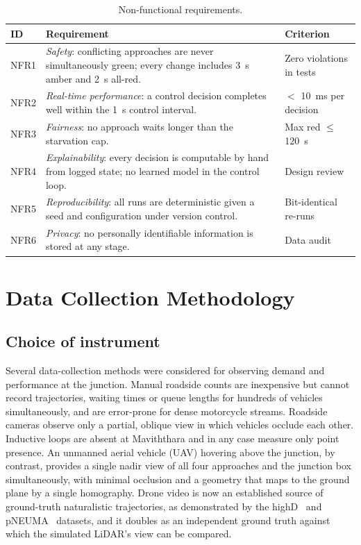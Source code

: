 \begin{table}[H]
\centering
\caption{Non-functional requirements.}
\label{tab:nfr}
\small
\begin{tabularx}{\textwidth}{@{}lXl@{}}
\toprule
\textbf{ID} & \textbf{Requirement} & \textbf{Criterion}\\
\midrule
NFR1 & \emph{Safety}: conflicting approaches are never simultaneously green; every change includes 3~s amber and 2~s all-red. & Zero violations in tests\\
NFR2 & \emph{Real-time performance}: a control decision completes well within the 1~s control interval. & $<$ 10~ms per decision\\
NFR3 & \emph{Fairness}: no approach waits longer than the starvation cap. & Max red $\le$ 120~s\\
NFR4 & \emph{Explainability}: every decision is computable by hand from logged state; no learned model in the control loop. & Design review\\
NFR5 & \emph{Reproducibility}: all runs are deterministic given a seed and configuration under version control. & Bit-identical re-runs\\
NFR6 & \emph{Privacy}: no personally identifiable information is stored at any stage. & Data audit\\
\bottomrule
\end{tabularx}
\end{table}

\section{Data Collection Methodology}\label{sec:method-data}

\subsection{Choice of instrument}
Several data-collection methods were considered for observing demand and performance at the junction. Manual roadside counts are inexpensive but cannot record trajectories, waiting times or queue lengths for hundreds of vehicles simultaneously, and are error-prone for dense motorcycle streams. Roadside cameras observe only a partial, oblique view in which vehicles occlude each other. Inductive loops are absent at Maviththara and in any case measure only point presence. An unmanned aerial vehicle (UAV) hovering above the junction, by contrast, provides a single nadir view of all four approaches and the junction box simultaneously, with minimal occlusion and a geometry that maps to the ground plane by a single homography. Drone video is now an established source of ground-truth naturalistic trajectories, as demonstrated by the highD~\cite{krajewski2018highd} and pNEUMA~\cite{barmpounakis2020pneuma} datasets, and it doubles as an independent ground truth against which the simulated LiDAR's view can be compared.

